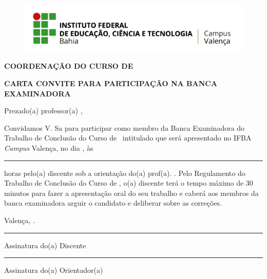 
\begin{center}
    \begin{figure}
        \centering
        \includegraphics[width=0.5\linewidth]{images/ifba_val_logo_hor.png}
    \end{figure}
    \begin{minipage}[!h]{0.80\textwidth}
        \centering
        \textbf{COORDENAÇÃO DO CURSO DE \MakeUppercase{\course}}
    \end{minipage}
\end{center}

\vspace*{1.2\baselineskip}
\begin{center}    
    \textbf{CARTA CONVITE PARA PARTICIPAÇÃO NA BANCA EXAMINADORA}    
\end{center}
\vspace{2\baselineskip}

\noindent Prezado(a) professor(a) \MakeUppercase{\cartaConviteProf},
\vspace{2\baselineskip}

Convidamos V. Sa para participar como membro da Banca Examinadora do Trabalho de Conclusão do Curso de \course\ intitulado \MakeUppercase{\tccTitle} que será apresentado no IFBA \textit{Campus} Valença, no dia , às \rule{2cm}{0.4pt} horas pelo(a) discente \MakeUppercase{\studentName} sob a orientação do(a) prof(a). \MakeUppercase{\advisor}. Pelo Regulamento do Trabalho de Conclusão do Curso de \course, o(a) discente terá o tempo máximo de 30 minutos para fazer a apresentação oral do seu trabalho e caberá aos membros da banca examinadora arguir o candidato e deliberar sobre as correções.

\vspace{2\baselineskip}
\hfill Valença, \signDateCartaConvite.
\vspace{3.5\baselineskip}

\begin{minipage}[!h]{0.45\textwidth}
    \centering
    \rule{\textwidth}{0.4pt}\par
    Assinatura do(a) Discente
\end{minipage}%
\hfill%
\begin{minipage}[!h]{0.45\textwidth}
    \centering
    \rule{\textwidth}{0.4pt}\par
    Assinatura do(a) Orientador(a)
\end{minipage}

